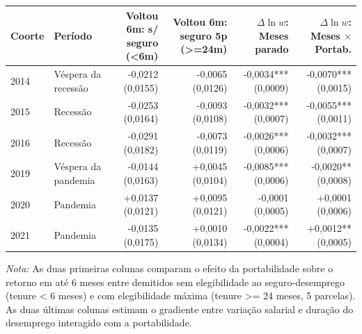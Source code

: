 \providecommand{\toprule}{\hline\hline}
\providecommand{\midrule}{\hline}
\providecommand{\bottomrule}{\hline\hline}
\providecommand{\addlinespace}[1][]{}
{\small
\renewcommand{\arraystretch}{1.12}
\begin{tabular}{llrrrr}
\toprule
Coorte & Período & Voltou 6m: s/ seguro (<6m) & Voltou 6m: seguro 5p (>=24m) & $\Delta\ln w$: Meses parado & $\Delta\ln w$: Meses $\times$ Portab. \\
\midrule
2014 & Véspera da recessão & -0,0212 (0,0155) & -0,0065 (0,0126) & -0,0034*** (0,0009) & -0,0070*** (0,0015) \\
2015 & Recessão & -0,0253 (0,0164) & -0,0093 (0,0108) & -0,0032*** (0,0007) & -0,0055*** (0,0011) \\
2016 & Recessão & -0,0291 (0,0182) & -0,0073 (0,0119) & -0,0026*** (0,0006) & -0,0032*** (0,0007) \\
2019 & Véspera da pandemia & -0,0144 (0,0163) & +0,0045 (0,0104) & -0,0085*** (0,0006) & -0,0020** (0,0008) \\
2020 & Pandemia & +0,0137 (0,0121) & +0,0095 (0,0121) & -0,0001 (0,0005) & +0,0001 (0,0006) \\
2021 & Pandemia & -0,0135 (0,0175) & +0,0010 (0,0134) & -0,0022*** (0,0004) & +0,0012** (0,0005) \\
\bottomrule
\end{tabular}
\vspace{2pt}
\par{\footnotesize \textit{Nota:} As duas primeiras colunas comparam o efeito da portabilidade sobre o retorno em até 6 meses entre demitidos sem elegibilidade ao seguro-desemprego (tenure < 6 meses) e com elegibilidade máxima (tenure >= 24 meses, 5 parcelas). As duas últimas colunas estimam o gradiente entre variação salarial e duração do desemprego interagido com a portabilidade.}
}
